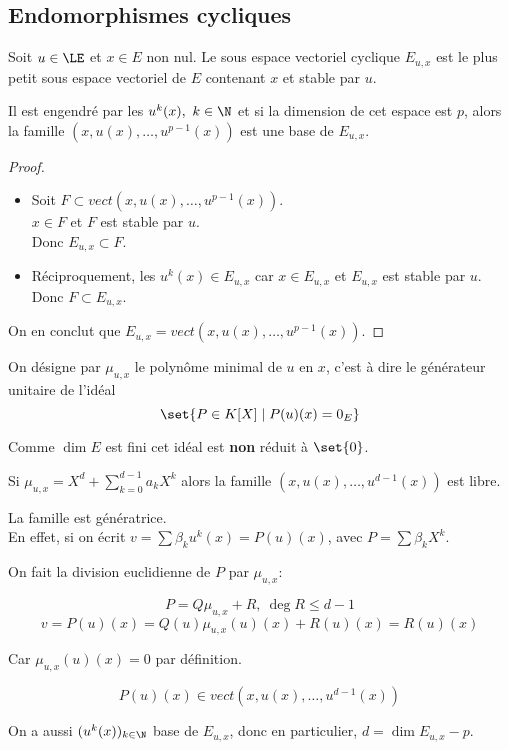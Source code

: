 \subsection{Endomorphismes cycliques}

Soit $u \in \LE$ et $x \in E$ non nul.
Le sous espace vectoriel cyclique $E_{u,x}$ est le plus petit sous espace vectoriel de $E$ contenant $x$ et stable par $u$.

Il est engendré par les $u^k(x), \ k \in \N$ et si la dimension de cet espace est $p$, alors la famille
$ (x, u(x), \ldots, u^{p-1}(x))$ est une base de $E_{u,x}$.

\begin{proof}
	\begin{itemize}
		\item Soit $F \subset vect (x, u(x), \ldots, u^{p-1}(x))$.\\
		      $x \in F$ et $F$ est stable par $u$.\\
		      Donc $E_{u,x} \subset F$.

		\item Réciproquement, les $u^k(x) \in E_{u,x}$ car $x \in E_{u,x}$ et $E_{u,x}$ est stable par $u$.
		      Donc $F \subset E_{u,x}$.
	\end{itemize}
	On en conclut que $E_{u,x} = vect (x, u(x), \ldots, u^{p-1}(x))$.
\end{proof}

On désigne par $\mu_{u,x}$ le polynôme minimal de $u$ en $x$, c'est à dire le générateur unitaire de l'idéal
$$ \set{P \in K[X] \mid P(u)(x) = 0_E}$$

Comme $\dim E$ est fini cet idéal est \textbf{non} réduit à $\set{0}$.


Si $\mu_{u,x} = X^d + \sum_{k=0}^{d-1} a_k X^k$ alors la famille $(x, u(x), \ldots, u^{d-1}(x))$ est libre.

La famille est génératrice.\\
En effet, si on écrit $v = \sum \beta_k u^k(x) = P(u)(x)$, avec $P = \sum \beta_k X^k$.

On fait la division euclidienne de $P$ par $\mu_{u,x}$:

$$ P = Q \mu_{u,x} + R, \ \deg R \leq d -1$$
$$ v = P(u)(x) = Q(u) \mu_{u,x}(u)(x) + R(u)(x) = R(u)(x)$$

Car $\mu_{u,x}(u)(x) = 0$ par définition.

$$ P(u)(x) \in vect (x, u(x), \ldots, u^{d-1}(x))$$

On a aussi $(u^k(x))_{k \in \N}$ base de $E_{u,x}$, donc en particulier, $ d = \dim E_{u,x} - p $.

